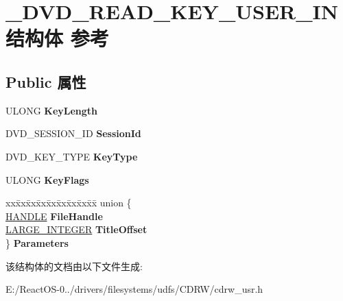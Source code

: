 \hypertarget{struct___d_v_d___r_e_a_d___k_e_y___u_s_e_r___i_n}{}\section{\+\_\+\+D\+V\+D\+\_\+\+R\+E\+A\+D\+\_\+\+K\+E\+Y\+\_\+\+U\+S\+E\+R\+\_\+\+I\+N结构体 参考}
\label{struct___d_v_d___r_e_a_d___k_e_y___u_s_e_r___i_n}
\subsection*{Public 属性}
\begin{DoxyCompactItemize}
\item 
\mbox{\label{struct___d_v_d___r_e_a_d___k_e_y___u_s_e_r___i_n_ad3af7580fd660a3ff27a4fa8f23d210e}} 
U\+L\+O\+NG {\bfseries Key\+Length}
\item 
\mbox{\label{struct___d_v_d___r_e_a_d___k_e_y___u_s_e_r___i_n_a493de37938dcb73529c6808307059883}} 
D\+V\+D\+\_\+\+S\+E\+S\+S\+I\+O\+N\+\_\+\+ID {\bfseries Session\+Id}
\item 
\mbox{\label{struct___d_v_d___r_e_a_d___k_e_y___u_s_e_r___i_n_a4b9dcc5af0e06c758148081acf2f0f38}} 
D\+V\+D\+\_\+\+K\+E\+Y\+\_\+\+T\+Y\+PE {\bfseries Key\+Type}
\item 
\mbox{\label{struct___d_v_d___r_e_a_d___k_e_y___u_s_e_r___i_n_a08b5542fa95d073fbc496003e2a39529}} 
U\+L\+O\+NG {\bfseries Key\+Flags}
\item 
\mbox{\label{struct___d_v_d___r_e_a_d___k_e_y___u_s_e_r___i_n_a45e7fbc58c11371d7eb5cbe0ec8e07c8}} 
\begin{tabbing}
xx\=xx\=xx\=xx\=xx\=xx\=xx\=xx\=xx\=\kill
union \{\\
\>\hyperlink{interfacevoid}{HANDLE} {\bfseries FileHandle}\\
\>\hyperlink{union___l_a_r_g_e___i_n_t_e_g_e_r}{LARGE\_INTEGER} {\bfseries TitleOffset}\\
\} {\bfseries Parameters}\\

\end{tabbing}\end{DoxyCompactItemize}


该结构体的文档由以下文件生成\+:\begin{DoxyCompactItemize}
\item 
E\+:/\+React\+O\+S-\/0../drivers/filesystems/udfs/\+C\+D\+R\+W/cdrw\+\_\+usr.\+h\end{DoxyCompactItemize}
